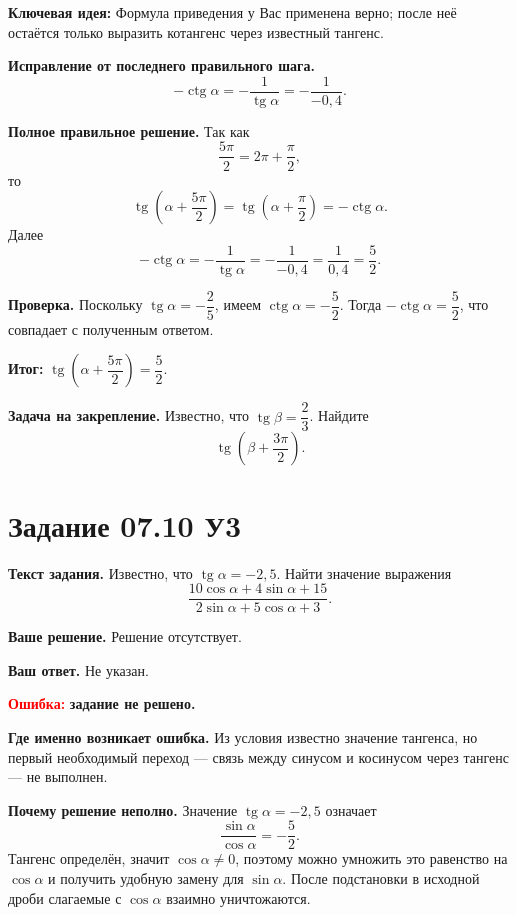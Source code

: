 \documentclass[12pt,a4paper]{article}
\newcommand{\errorlabel}[1]{\textcolor{red}{\textbf{Ошибка:}} \textbf{#1}}
\newcommand{\keyidea}{\textcolor{blue!60!black}{\textbf{Ключевая идея:}}}
\newcommand{\resultlabel}{\textcolor{teal!60!black}{\textbf{Итог:}}}
\begin{document}
\keyidea{} Формула приведения у Вас применена верно; после неё остаётся только выразить котангенс через известный тангенс.

\textbf{Исправление от последнего правильного шага.}
\[
-\operatorname{ctg}\alpha
=-\frac{1}{\operatorname{tg}\alpha}
=-\frac{1}{-0{,}4}.
\]

\textbf{Полное правильное решение.} Так как
\[
\frac{5\pi}{2}=2\pi+\frac{\pi}{2},
\]
то
\[
\operatorname{tg}\left(\alpha+\frac{5\pi}{2}\right)
=\operatorname{tg}\left(\alpha+\frac{\pi}{2}\right)
=-\operatorname{ctg}\alpha.
\]
Далее
\[
-\operatorname{ctg}\alpha
=-\frac{1}{\operatorname{tg}\alpha}
=-\frac{1}{-0{,}4}
=\frac{1}{0{,}4}
=\frac{5}{2}.
\]

\textbf{Проверка.} Поскольку $\operatorname{tg}\alpha=-\dfrac25$, имеем $\operatorname{ctg}\alpha=-\dfrac52$. Тогда $-\operatorname{ctg}\alpha=\dfrac52$, что совпадает с полученным ответом.

\resultlabel{} $\boxed{\operatorname{tg}\left(\alpha+\dfrac{5\pi}{2}\right)=\dfrac52}$.

\textbf{Задача на закрепление.} Известно, что $\operatorname{tg}\beta=\dfrac23$. Найдите
\[
\operatorname{tg}\left(\beta+\frac{3\pi}{2}\right).
\]

\newpage
{}\label{task:0710u3}
\section*{Задание 07.10 У3}

\textbf{Текст задания.} Известно, что $\operatorname{tg}\alpha=-2{,}5$. Найти значение выражения
\[
\frac{10\cos\alpha+4\sin\alpha+15}{2\sin\alpha+5\cos\alpha+3}.
\]

\textbf{Ваше решение.} Решение отсутствует.

\textbf{Ваш ответ.} Не указан.

\errorlabel{задание не решено.}

\textbf{Где именно возникает ошибка.} Из условия известно значение тангенса, но первый необходимый переход --- связь между синусом и косинусом через тангенс --- не выполнен.

\textbf{Почему решение неполно.} Значение $\operatorname{tg}\alpha=-2{,}5$ означает
\[
\frac{\sin\alpha}{\cos\alpha}=-\frac52.
\]
Тангенс определён, значит $\cos\alpha\ne0$, поэтому можно умножить это равенство на $\cos\alpha$ и получить удобную замену для $\sin\alpha$. После подстановки в исходной дроби слагаемые с $\cos\alpha$ взаимно уничтожаются.
\end{document}
